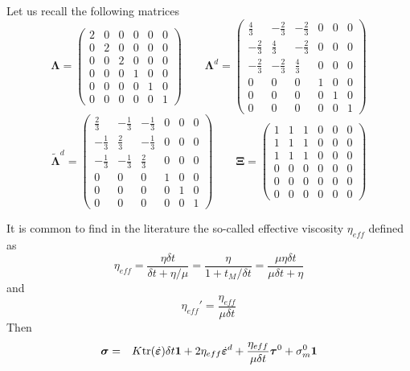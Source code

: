 Let us recall the following matrices
\[
{\bm \Lambda}=
\left(
\begin{array}{cccccc}
2 & 0 & 0 & 0 & 0 & 0 \\
0 & 2 & 0 & 0 & 0 & 0 \\
0 & 0 & 2 & 0 & 0 & 0 \\
0 & 0 & 0 & 1 & 0 & 0 \\
0 & 0 & 0 & 0 & 1 & 0 \\
0 & 0 & 0 & 0 & 0 & 1 
\end{array}
\right)
\qquad
{\bm \Lambda}^d
=
\left(
\begin{array}{cccccc}
\frac43 & - \frac23 & - \frac23 & 0 & 0 & 0 \\
-\frac23 & \frac43 & - \frac23  & 0 & 0 & 0\\
-\frac23& - \frac23 & \frac43  & 0 & 0 & 0\\
0&0&0& 1&0 &0  \\
0&0&0&0&1 &0\\
0&0&0&0&0& 1
\end{array}
\right)
\]
\[
\tilde{\bm \Lambda}^d
=
\left(
\begin{array}{cccccc}
\frac23 & - \frac13 & - \frac13 & 0 & 0 & 0 \\
-\frac13 & \frac23 & - \frac13  & 0 & 0 & 0\\
-\frac13& - \frac13 & \frac23  & 0 & 0 & 0\\
0&0&0& 1&0 &0  \\
0&0&0&0&1 &0\\
0&0&0&0&0& 1
\end{array}
\right)
\qquad
{\bm \Xi}=
\left(
\begin{array}{cccccc}
1 & 1 & 1 & 0 & 0 & 0\\ 
1 & 1 & 1 & 0 & 0 & 0\\ 
1 & 1 & 1 & 0 & 0 & 0\\ 
0 & 0 & 0 & 0 & 0 & 0 \\
0 & 0 & 0 & 0 & 0 & 0 \\
0 & 0 & 0 & 0 & 0 & 0 
\end{array}
\right)
\]

It is common to find in the literature the so-called effective 
viscosity $\eta_{eff}$ defined as 
\[
\eta_{eff}
=\frac{\eta \delta t}{\delta t + \eta/\mu}
=\frac{\eta}{1 + t_M/\delta t}
=\frac{\mu\eta \delta t}{\mu \delta t + \eta}
\]
and 
\[
\eta_{eff}' = \frac{\eta_{eff}}{\mu\delta t}
\]
Then 
\begin{eqnarray}
\bm \sigma 
&=& 
K {\rm tr}(\dot{\bm\varepsilon}) \delta t {\bm 1}  +
2\eta_{eff} \dot{\bm\varepsilon}^d +
\frac{ \eta_{eff}}{\mu\delta t}  \bm\tau^0 + \sigma_m^0 {\bm 1}
\end{eqnarray}



